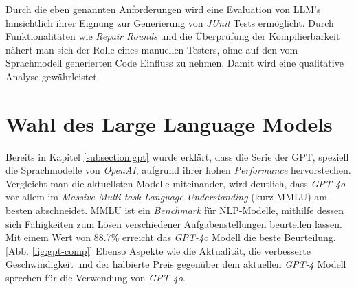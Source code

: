 Durch die eben genannten Anforderungen wird eine Evaluation von LLM's hinsichtlich ihrer Eignung zur Generierung von \textit{JUnit} Tests ermöglicht. Durch Funktionalitäten wie \textit{Repair Rounds} und die Überprüfung der Kompilierbarkeit nähert man sich der Rolle eines manuellen Testers, ohne auf den vom Sprachmodell generierten Code Einfluss zu nehmen. Damit wird eine qualitative Analyse gewährleistet.

\section{Wahl des Large Language Models}
Bereits in Kapitel \ref{subsection:gpt} wurde erklärt, dass die Serie der GPT, speziell die Sprachmodelle von \textit{OpenAI}, aufgrund ihrer hohen \textit{Performance} hervorstechen. Vergleicht man die aktuellsten Modelle miteinander, wird deutlich, dass \textit{GPT-4o} vor allem im \textit{Massive Multi-task Language Understanding} (kurz MMLU) am besten abschneidet. \acs{MMLU} ist ein \textit{Benchmark} für NLP-Modelle, mithilfe dessen sich Fähigkeiten zum Lösen verschiedener Aufgabenstellungen beurteilen lassen. Mit einem Wert von 88.7\% erreicht das \textit{GPT-4o} Modell die beste Beurteilung. [Abb. \ref{fig:gpt-comp}] \cite{HelloGPT4o} Ebenso Aspekte wie die Aktualität, die verbesserte Geschwindigkeit und der halbierte Preis gegenüber dem aktuellen \textit{GPT-4} Modell sprechen für die Verwendung von \textit{GPT-4o}. \cite{HelloGPT4o} 

